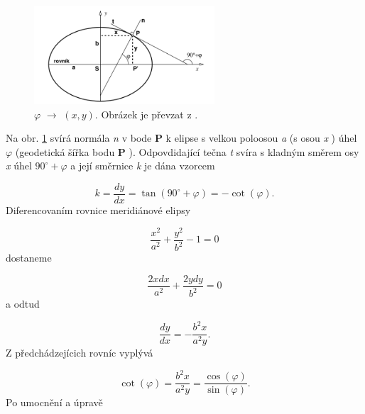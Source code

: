 
\begin{figure}[ht!]
\begin{center}

\includegraphics[width=0.60\textwidth]{FIG/CimbalnikObr1-14}
\caption{$\varphi$ $\rightarrow$ $\left(x, y\right)$. Obrázek je převzat z \cite{Cimbalnik1997}.}
\label{fig:cim114}
\end{center}
\end{figure}

Na obr. \ref{fig:cim114} svírá normála \textit{n} v bode \textbf{P} k elipse s 
velkou poloosou \textit{a} (s osou \textit{x} ) úhel $\varphi$ (geodetická šířka 
bodu \textbf{P} ). Odpovdidající tečna \textit{t} svíra s kladným směrem osy 
\textit{x} úhel $90^{\circ} + \varphi$ a její směrnice \textit{k} je dána vzorcem

\begin{equation}
k = \dfrac{dy}{dx} = \tan{\left(90^{\circ} + \varphi\right)} = -\cot{\left(\varphi\right)}.
\end{equation}
Diferencovaním rovnice meridiánové elipsy

\begin{equation}
\dfrac{x^{2}}{a^{2}} + \dfrac{y^{2}}{b^{2}} -1 = 0
\end{equation}
dostaneme

\begin{equation}
\dfrac{2xdx}{a^{2}} + \dfrac{2ydy}{b^{2}} = 0
\end{equation}
a odtud

\begin{equation}
\dfrac{dy}{dx} = - \dfrac{b^{2}x}{a^{2}y}.
\end{equation}
Z předchádzejícich rovníc vyplývá

\begin{equation}
\cot{\left(\varphi\right)} = \dfrac{b^{2}x}{a^{2}y} = \dfrac{\cos{\left(\varphi\right)}}{\sin{\left(\varphi\right)}}.
\end{equation}
Po umocnění a úpravě

